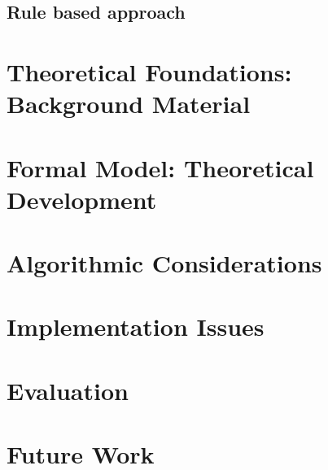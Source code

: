 \documentclass[11pt,a4paper]{report}
\begin{document}
\section{Rule based approach}
\newpage
\chapter{Theoretical Foundations: Background Material}
\newpage
\chapter{Formal Model: Theoretical Development}
\newpage
\chapter{Algorithmic Considerations}
\newpage
\chapter{Implementation Issues}
\newpage
\chapter{Evaluation}
\newpage
\chapter{Future Work}
\newpage
\end{document}
